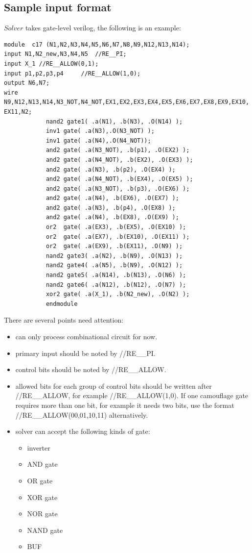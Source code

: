 \documentclass{article}
\begin{document}
\begin{itemize}
	\subsection{Sample input format}
	$Solver$ takes gate-level verilog, the following is an example: 
	\newline

 		 \begin{verbatim}
module	c17 (N1,N2,N3,N4,N5,N6,N7,N8,N9,N12,N13,N14);
input N1,N2_new,N3,N4,N5  //RE__PI;
input X_1 //RE__ALLOW(0,1);
input p1,p2,p3,p4     //RE__ALLOW(1,0);
output N6,N7;
wire N9,N12,N13,N14,N3_NOT,N4_NOT,EX1,EX2,EX3,EX4,EX5,EX6,EX7,EX8,EX9,EX10,
EX11,N2;
			nand2 gate1( .a(N1), .b(N3), .O(N14) );
			inv1 gate( .a(N3),.O(N3_NOT) );
			inv1 gate( .a(N4),.O(N4_NOT));
			and2 gate( .a(N3_NOT), .b(p1), .O(EX2) );
			and2 gate( .a(N4_NOT), .b(EX2), .O(EX3) );
			and2 gate( .a(N3), .b(p2), .O(EX4) );
			and2 gate( .a(N4_NOT), .b(EX4), .O(EX5) );
			and2 gate( .a(N3_NOT), .b(p3), .O(EX6) );
			and2 gate( .a(N4), .b(EX6), .O(EX7) );
			and2 gate( .a(N3), .b(p4), .O(EX8) );
			and2 gate( .a(N4), .b(EX8), .O(EX9) );
			or2  gate( .a(EX3), .b(EX5), .O(EX10) );
			or2  gate( .a(EX7), .b(EX10), .O(EX11) );
			or2  gate( .a(EX9), .b(EX11), .O(N9) );
			nand2 gate3( .a(N2), .b(N9), .O(N13) );
			nand2 gate4( .a(N5), .b(N9), .O(N12) );
			nand2 gate5( .a(N14), .b(N13), .O(N6) );
			nand2 gate6( .a(N12), .b(N12), .O(N7) );
			xor2 gate( .a(X_1), .b(N2_new), .O(N2) );
			endmodule
  		\end{verbatim}


	There are several points need attention:
	\begin{itemize}
		\item can only process combinational circuit for now. 
		\item primary input should be noted by \///RE\_\_PI.
		\item control bits should be noted by  \///RE\_\_ALLOW.
		\item allowed bits for each group of control bits should be written after  \///RE\_\_ALLOW, for example  \///RE\_\_ALLOW(1,0). If one camouflage gate requires more than one bit, for example it needs two bits, use the format  \///RE\_\_ALLOW(00,01,10,11) alternatively. 
		\item solver can accept the following kinds of gate:
			\begin{itemize}
				\item inverter
				\item AND gate
				\item OR gate
				\item XOR gate
				\item NOR gate
				\item NAND gate
				\item BUF 
			\end{itemize}
	\end{itemize}

\end{itemize}
\end{document}

